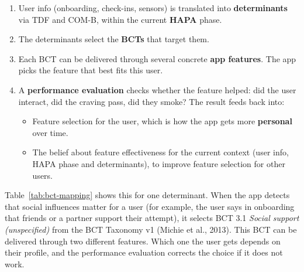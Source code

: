 \begin{enumerate}
    \item User info (onboarding, check-ins, sensors) is translated into \textbf{determinants} via TDF and COM-B, within the current \textbf{HAPA} phase.
    \item The determinants select the \textbf{BCTs} that target them.
    \item Each BCT can be delivered through several concrete \textbf{app features}. The app picks the feature that best fits this user.
    \item A \textbf{performance evaluation} checks whether the feature helped: did the user interact, did the craving pass, did they smoke? The result feeds back into:
    \begin{itemize}
        \item Feature selection for the user, which is how the app gets more \textbf{personal} over time.
        \item The belief about feature effectiveness for the current context (user info, HAPA phase and determinants), to improve feature selection for other users.
    \end{itemize}
      
\end{enumerate}

Table~\ref{tab:bct-mapping} shows this for one determinant. When the app detects that social influences matter for a user (for example, the user says in onboarding that friends or a partner support their attempt), it selects BCT 3.1 \textit{Social support (unspecified)} from the BCT Taxonomy v1 (Michie et al., 2013). This BCT can be delivered through two different features. Which one the user gets depends on their profile, and the performance evaluation corrects the choice if it does not work.

